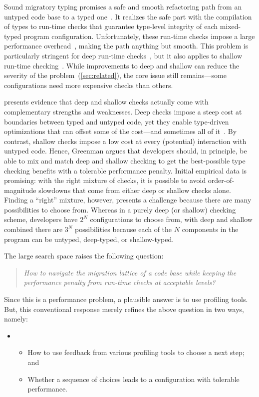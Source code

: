 
Sound migratory typing promises a safe and smooth refactoring path from an
untyped code base to a typed one~\cite{tf-dls-2006, tfffgksst-snapl-2017}. It
realizes the safe part with the compilation of types to run-time checks that
guarantee type-level integrity of each mixed-typed program configuration.
Unfortunately, these run-time checks impose a large performance
overhead~\cite{gtnffvf-jfp-2019}, making the path anything but smooth.
This problem is particularly stringent for deep run-time
checks~\cite{tf-dls-2006, st-sfp-2006}, but it also applies to shallow run-time
checking~\cite{gm-pepm-2018}.
While improvements to deep and shallow can reduce the severity of the
problem~(\cref{sec:related}), the core issue still remains---some configurations
need more expensive checks than others.

\citet{g-thesis-2020,g-deep-shallow} presents evidence that deep and shallow
checks actually come with complementary strengths and weaknesses. Deep checks
impose a steep cost at boundaries between typed and untyped code, yet they
enable type-driven optimizations that can offset some of the cost---and sometimes
all of it~\cite{s-northeastern-2015}.
By contrast, shallow checks impose a low cost at every (potential) interaction
with untyped code.
Hence, Greenman argues that developers should, in
principle, be able to mix and match deep and shallow checking to get the
best-possible type checking benefits with a tolerable performance penalty.
Initial empirical data is promising: with the right mixture of checks,
it is possible to avoid order-of-magnitude slowdowns that come from either
deep or shallow checks alone.
Finding a ``right'' mixture, however, presents a challenge because there
are many possibilities to choose from.
Whereas in a purely deep (or shallow) checking scheme, developers have
$2^N$ configurations to choose from, with deep and shallow combined
there are $3^N$ possibilities because each of the $N$ components in
the program can be untyped, deep-typed, or shallow-typed.

The large search space raises the following question:
\begin{quote} \em
 How to navigate the migration lattice of a code base while keeping
 the performance penalty from run-time checks at acceptable levels?
\end{quote}
Since this is a performance problem, a plausible answer is to use profiling tools.
But, this conventional response merely refines the above question in two
ways, namely:
\begin{itemize} \item[] \begin{itemize}\em
\item How to use feedback from various profiling tools to choose a next step; and
\item Whether a sequence of choices leads to a configuration with tolerable performance.
\end{itemize} \end{itemize}

